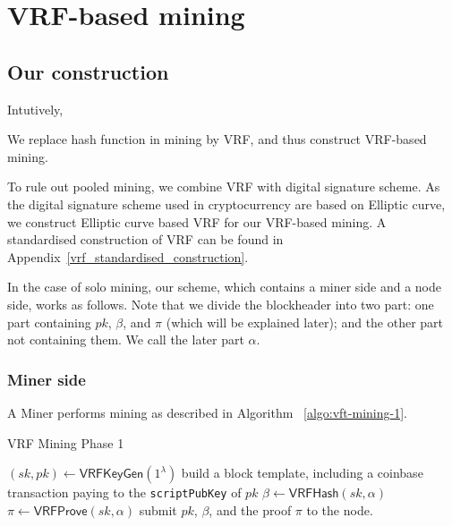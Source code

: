 \section{VRF-based mining}

\subsection{Our construction}

Intutively, 

We replace hash function in mining by VRF, and thus construct VRF-based mining.

To rule out pooled mining, we combine VRF with digital signature scheme.
As the digital signature scheme used in cryptocurrency are based on Elliptic curve, we construct Elliptic curve based VRF for our VRF-based mining.
A standardised construction of VRF can be found in Appendix~\ref{vrf_standardised_construction}.




In the case of solo mining, our scheme, which contains a miner side and a node side, works as follows. Note that we divide the blockheader into two part:
one part containing $pk$, $\beta$, and $\pi$ (which will be explained later);
and the other part not containing them.
We call the later part $\alpha$.

\subsubsection{Miner side\\}

A Miner performs mining as described in Algorithm ~\ref{algo:vft-mining-1}.


\begin{algorithm}[H]
\caption{VRF Mining Phase 1}
\label{algo:vft-mining-1}
\SetAlgoLined
  $(sk, pk) \gets \mathsf{VRFKeyGen}(1^{\lambda})$\;
  build a block template, including a coinbase transaction paying to the \texttt{scriptPubKey} of $pk$\;
  $\beta \gets \mathsf{VRFHash}(sk, \alpha)$\;
  $\pi \gets \mathsf{VRFProve}(sk, \alpha)$\;
  submit $pk$, $\beta$, and the proof $\pi$ to the node.
\end{algorithm}

